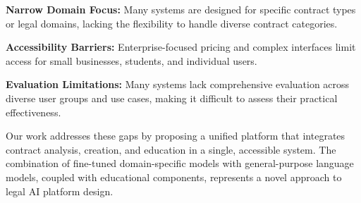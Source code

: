 \textbf{Narrow Domain Focus:} Many systems are designed for specific contract types or legal domains, lacking the flexibility to handle diverse contract categories.

\textbf{Accessibility Barriers:} Enterprise-focused pricing and complex interfaces limit access for small businesses, students, and individual users.

\textbf{Evaluation Limitations:} Many systems lack comprehensive evaluation across diverse user groups and use cases, making it difficult to assess their practical effectiveness.

Our work addresses these gaps by proposing a unified platform that integrates contract analysis, creation, and education in a single, accessible system. The combination of fine-tuned domain-specific models with general-purpose language models, coupled with educational components, represents a novel approach to legal AI platform design.
